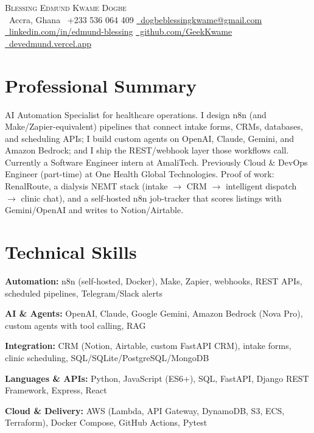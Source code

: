 \documentclass[letterpaper,11pt]{article}
\begin{document}

\begin{center}
  {\Huge \scshape Blessing Edmund Kwame Dogbe}\\[5pt]
  \small
  \faMapMarker*\ Accra, Ghana \quad
  \faPhone\ +233 536 064 409 \quad
  \href{mailto:dogbeblessingkwame@gmail.com}{\faEnvelope\ dogbeblessingkwame@gmail.com}\\[3pt]
  \href{https://linkedin.com/in/edmund-blessing}{\faLinkedin\ linkedin.com/in/edmund-blessing} \quad
  \href{https://github.com/GeekKwame}{\faGithub\ github.com/GeekKwame} \quad
  \href{https://devedmund.vercel.app/}{\faGlobe\ devedmund.vercel.app}
\end{center}

\section{Professional Summary}
AI Automation Specialist for healthcare operations. I design n8n (and Make/Zapier-equivalent) pipelines that connect intake forms, CRMs, databases, and scheduling APIs; I build custom agents on OpenAI, Claude, Gemini, and Amazon Bedrock; and I ship the REST/webhook layer those workflows call. Currently a Software Engineer intern at AmaliTech. Previously Cloud \& DevOps Engineer (part-time) at One Health Global Technologies. Proof of work: RenalRoute, a dialysis NEMT stack (intake $\rightarrow$ CRM $\rightarrow$ intelligent dispatch $\rightarrow$ clinic chat), and a self-hosted n8n job-tracker that scores listings with Gemini/OpenAI and writes to Notion/Airtable.

\section{Technical Skills}
\begin{itemize}[leftmargin=0in, label={}, itemsep=2pt]
  \small{
  \item \textbf{Automation:} n8n (self-hosted, Docker), Make, Zapier, webhooks, REST APIs, scheduled pipelines, Telegram/Slack alerts
  \item \textbf{AI \& Agents:} OpenAI, Claude, Google Gemini, Amazon Bedrock (Nova Pro), custom agents with tool calling, RAG
  \item \textbf{Integration:} CRM (Notion, Airtable, custom FastAPI CRM), intake forms, clinic scheduling, SQL/SQLite/PostgreSQL/MongoDB
  \item \textbf{Languages \& APIs:} Python, JavaScript (ES6+), SQL, FastAPI, Django REST Framework, Express, React
  \item \textbf{Cloud \& Delivery:} AWS (Lambda, API Gateway, DynamoDB, S3, ECS, Terraform), Docker Compose, GitHub Actions, Pytest
  }
\end{itemize}
\end{document}
